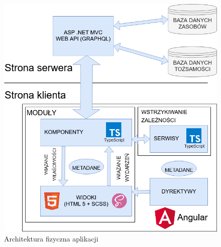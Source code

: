 \begin{figure}[H]
\includegraphics[width=\textwidth]{rys/arch-fiz.png}
\caption{Architektura fizyczna aplikacji}
\label{fig:arch_fiz}
\end{figure}


